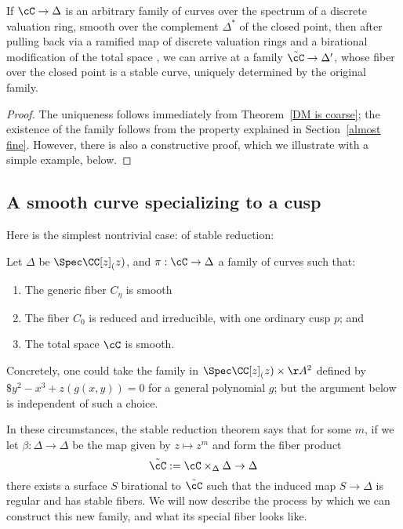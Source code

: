 \begin{theorem}
If $\cC \to \Delta$ is an arbitrary family of curves over the spectrum of a discrete valuation ring, smooth over the complement $\Delta^*$ of the closed point, then after pulling back via a ramified map of
discrete valuation rings and a birational modification of the total space , we can arrive at a family $\tilde \cC \to \Delta'$, whose fiber over the closed point is a stable curve, uniquely determined by the original family.
\end{theorem}

\begin{proof} The uniqueness follows immediately from Theorem~\ref{DM is coarse}; the existence of the family follows from the property explained in Section~\ref{almost fine}. However, there is also a constructive proof, which we  illustrate with a simple example, below.
\end{proof}

\subsection{A smooth curve specializing to a cusp}

Here is  the simplest nontrivial case: of stable reduction:

Let $\Delta$ be $\Spec \CC[z]_(z)$, and $\pi : \cC \to \Delta$ a family of curves such that:
\begin{enumerate}
\item The generic fiber $C_\eta$ is smooth
\item The fiber $C_0$ is reduced and irreducible, with one ordinary cusp $p$; and
\item The total space $\cC$ is smooth.
\end{enumerate}

Concretely, one could take the family in $\Spec \CC[z]_(z) \times \AA^2$
defined by $\$y^2-x^3+z(g(x,y)) = 0$ for a general polynomial $g$; but the argument below is independent of such a choice.

In these circumstances, the stable reduction theorem says that for some $m$, if we let $\beta : \Delta \to \Delta$ be the map given by $z \mapsto z^m$ and form the fiber product
$$
\tilde \cC := \cC \times_\Delta \Delta \to \Delta
$$
there exists a surface $S$ birational to $\tilde \cC$ such that the induced map $S \to \Delta$ is regular and has stable fibers. We will now describe the process by which we can construct this new family, and what its special fiber looks like.

